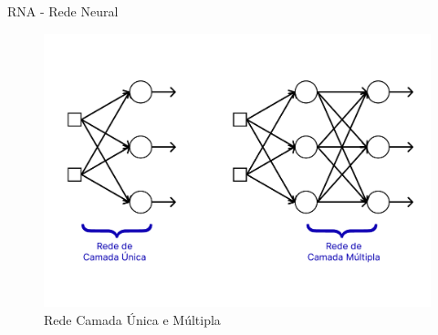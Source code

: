 \documentclass{beamer}
\begin{document}
    \begin{frame}{RNA - Rede Neural}
        \begin{figure}
            \includegraphics[scale=0.25]{figuras/network_layers.pdf}
		    \caption{Rede Camada Única e Múltipla \citep[adaptado de][]{haykin2009}}
	    \end{figure}
    \end{frame}
\end{document}

